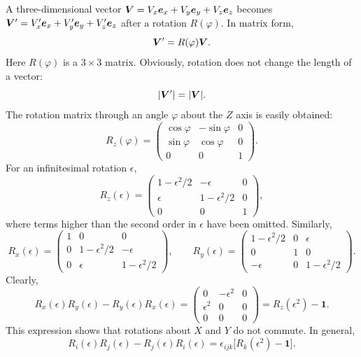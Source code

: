 A three-dimensional vector $\bm{V}=V_x\bm{e}_x+V_y\bm{e}_y+V_z\bm{e}_z$ becomes $\bm{V}'=V'_x\bm{e}_x+V'_y\bm{e}_y+V'_z\bm{e}_z$ after a rotation $R(\varphi)$. In matrix form,
\begin{equation}
\bm{V}'=R(\varphi)\bm{V}.
\end{equation}
Here $R(\varphi)$ is a $3\times3$ matrix. Obviously, rotation does not change the length of a vector:
\begin{equation}
|\bm{V}'|=|\bm{V}|.
\end{equation}
The rotation matrix through an angle $\varphi$ about the $Z$ axis is easily obtained:
\begin{equation}
R_z(\varphi)=\begin{pmatrix}\cos\varphi&-\sin\varphi&0\\ \sin\varphi&\cos\varphi&0\\0&0&1\end{pmatrix}.
\end{equation}
For an infinitesimal rotation $\epsilon$,
\begin{equation}
R_z(\epsilon)=\begin{pmatrix}1-\epsilon^2/2&-\epsilon&0\\\epsilon&1-\epsilon^2/2&0\\0&0&1\end{pmatrix},
\end{equation}
where terms higher than the second order in $\epsilon$ have been omitted. Similarly,
\begin{equation}
R_x(\epsilon)=\begin{pmatrix}1&0&0\\0&1-\epsilon^2/2&-\epsilon\\0&\epsilon&1-\epsilon^2/2\end{pmatrix},\qquad
R_y(\epsilon)=\begin{pmatrix}1-\epsilon^2/2&0&\epsilon\\0&1&0\\-\epsilon&0&1-\epsilon^2/2\end{pmatrix}.
\end{equation}
Clearly,
\begin{equation}
R_x(\epsilon)R_y(\epsilon)-R_y(\epsilon)R_x(\epsilon)
=\begin{pmatrix}0&-\epsilon^2&0\\\epsilon^2&0&0\\0&0&0\end{pmatrix}
=R_z(\epsilon^2)-\mathbf1.
\end{equation}
This expression shows that rotations about $X$ and $Y$ do not commute. In general,
\begin{equation}
R_i(\epsilon)R_j(\epsilon)-R_j(\epsilon)R_i(\epsilon)
=\epsilon_{ijk}\big[R_k(\epsilon^2)-\mathbf1\big].
\end{equation}


